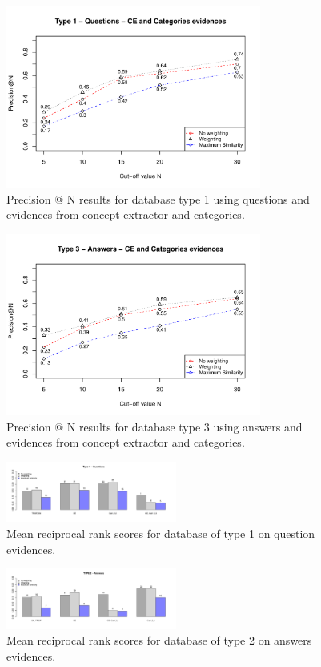 \documentclass[conference]{IEEEtran}
\begin{document}
\begin{figure}[!t]
	\centering
	\includegraphics[width=3.3in]{type1questions_PAtN.pdf}
	\caption{Precision @ N results for database type 1 using questions and evidences from concept extractor and categories.}
	\label{fig:pntype1}
\end{figure}

\begin{figure}[!t]
	\centering
	\includegraphics[width=3.3in]{type3answers_PAtN.pdf}
	\caption{Precision @ N results for database type 3 using answers and evidences from concept extractor and categories.}
	\label{fig:pntype3}
\end{figure}


\begin{figure}[!t]
	\centering
	\includegraphics[width=0.5\textwidth]{mrrType1Questions.pdf}
	\caption{Mean reciprocal rank scores for database of type 1 on question evidences.}
	\label{fig:mrrtype1}
\end{figure}

\begin{figure}[!t]
	\centering
	\includegraphics[width=0.5\textwidth]{mrrType2Answers.pdf}
	\caption{Mean reciprocal rank scores for database of type 2 on answers evidences.}
	\label{fig:mrrtype2}
\end{figure}
\end{document}
